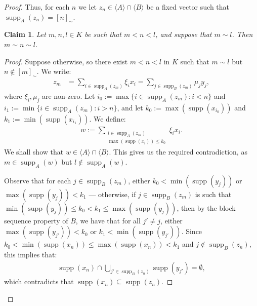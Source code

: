\documentclass[10pt,a4paper]{amsart}
\theoremstyle{plain}
\numberwithin{equation}{section}
\newtheorem{claim}{Claim}
\theoremstyle{definition}
\newcommand{\func}{\operatorname}
\renewcommand{\c}[1]{\langle #1 \rangle}
\newcommand{\supp}{\func{supp}}
\newenvironment{midproof}[1][Proof]
  {\begin{proof}[#1]\renewcommand{\qedsymbol}{$\blacksquare$}}
  {\end{proof}}
\begin{document}
\begin{proof}
    Thus, for each $n$ we let $z_n \in \c{A} \cap \c{B}$ be a fixed vector such that $\supp_A(z_n) = [n]_\sim$. 

    \begin{claim}
    \label{claim:eq.classes.are.blocks}
        Let $m,n,l \in K$ be such that $m < n < l$, and suppose that $m \sim l$. Then $m \sim n \sim l$.
    \end{claim}

    \begin{midproof}
        Suppose otherwise, so there exist $m < n < l$ in $K$ such that $m \sim l$ but $n \notin [m]_\sim$. We write:
        \begin{align*}
            z_m &= \sum_{i \in \supp_A(z_m)} \xi_ix_i = \sum_{j \in \supp_B(z_m)} \mu_jy_j,
        \end{align*} 
        where $\xi_i,\mu_j$ are non-zero. Let $i_0 := \max\{i \in \supp_A(z_m) : i < n\}$ and $i_1 := \min\{i \in \supp_A(z_m) : i > n\}$, and let $k_0 := \max(\supp(x_{i_0}))$ and $k_1 := \min(\supp(x_{i_1}))$. We define:
        \begin{align*}
            w := \sum_{\substack{i \in \supp_A(z_m) \\ \max(\supp(x_i)) \leq k_0}} \xi_ix_i.
        \end{align*}
        We shall show that $w \in \c{A} \cap \c{B}$. This gives us the required contradiction, as $m \in \supp_A(w)$ but $l \not\in \supp_A(w)$. 

        Observe that for each $j \in \supp_B(z_m)$, either $k_0 < \min(\supp(y_j))$ or $\max(\supp(y_j)) < k_1$ --- otherwise, if $j \in \supp_B(z_m)$ is such that $\min(\supp(y_j)) \leq k_0 < k_1 \leq \max(\supp(y_j))$, then by the block sequence property of $B$, we have that for all $j' \neq j$, either $\max(\supp(y_{j'})) < k_0$ or $k_1 < \min(\supp(y_{j'}))$. Since $k_0 < \min(\supp(x_n)) \leq \max(\supp(x_n)) < k_1$ and $j \notin \supp_B(z_n)$, this implies that:
        \begin{align*}
            \supp(x_n) \cap \bigcup_{j' \in \supp_B(z_n)} \supp(y_{j'}) = \emptyset,
        \end{align*}
        which contradicts that $\supp(x_n) \subseteq \supp(z_n)$. 


\end{midproof}
\end{proof}
\end{document}
